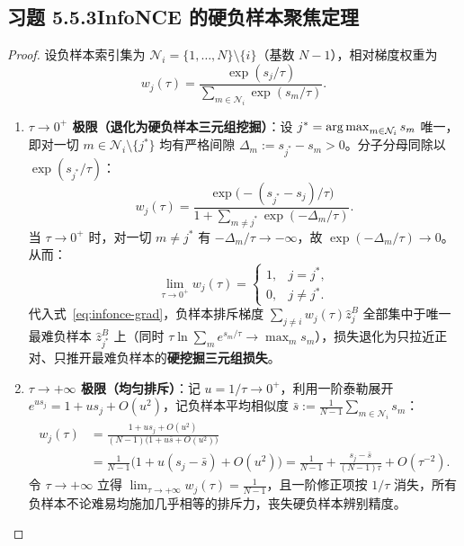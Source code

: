 \subsection*{习题 5.5.3\quad InfoNCE 的硬负样本聚焦定理}
\begin{proof}
设负样本索引集为 $\mathcal{N}_i = \{1, \dots, N\} \setminus \{i\}$（基数 $N-1$），相对梯度权重为
\[
  w_j(\tau) = \frac{\exp(s_j / \tau)}{\sum_{m \in \mathcal{N}_i} \exp(s_m / \tau)}.
\]
\begin{enumerate}[label=(\alph*), leftmargin=1.8em]
  \item \textbf{$\tau \to 0^+$ 极限（退化为硬负样本三元组挖掘）}：设 $j^* = \operatorname*{arg\,max}_{m \in \mathcal{N}_i} s_m$ 唯一，即对一切 $m \in \mathcal{N}_i \setminus \{j^*\}$ 均有严格间隙 $\Delta_m := s_{j^*} - s_m > 0$。分子分母同除以 $\exp(s_{j^*} / \tau)$：
  \[
    w_j(\tau) = \frac{\exp\!\big(-(s_{j^*} - s_j)/\tau\big)}{1 + \sum_{m \ne j^*} \exp(-\Delta_m / \tau)}.
  \]
  当 $\tau \to 0^+$ 时，对一切 $m \ne j^*$ 有 $-\Delta_m / \tau \to -\infty$，故 $\exp(-\Delta_m / \tau) \to 0$。从而：
  \[
    \lim_{\tau \to 0^+} w_j(\tau) = \begin{cases} 1, & j = j^*, \\ 0, & j \neq j^*. \end{cases}
  \]
  代入式~\eqref{eq:infonce-grad}，负样本排斥梯度 $\sum_{j \ne i} w_j(\tau)\hat{z}_j^B$ 全部集中于唯一最难负样本 $\hat{z}_{j^*}^B$ 上（同时 $\tau \ln \sum_m e^{s_m/\tau} \to \max_m s_m$），损失退化为只拉近正对、只推开最难负样本的\textbf{硬挖掘三元组损失}。

  \item \textbf{$\tau \to +\infty$ 极限（均匀排斥）}：记 $u = 1/\tau \to 0^+$，利用一阶泰勒展开 $e^{u s_j} = 1 + u s_j + O(u^2)$，记负样本平均相似度 $\bar{s} := \frac{1}{N-1}\sum_{m \in \mathcal{N}_i} s_m$：
  \begin{align*}
    w_j(\tau)
    &= \frac{1 + u s_j + O(u^2)}{(N-1)\big(1 + u\bar{s} + O(u^2)\big)} \\
    &= \frac{1}{N-1}\big(1 + u(s_j - \bar{s}) + O(u^2)\big)
     = \frac{1}{N-1} + \frac{s_j - \bar{s}}{(N-1)\tau} + O(\tau^{-2}).
  \end{align*}
  令 $\tau \to +\infty$ 立得 $\lim_{\tau \to +\infty} w_j(\tau) = \frac{1}{N-1}$，且一阶修正项按 $1/\tau$ 消失，所有负样本不论难易均施加几乎相等的排斥力，丧失硬负样本辨别精度。
\end{enumerate}
\end{proof}


